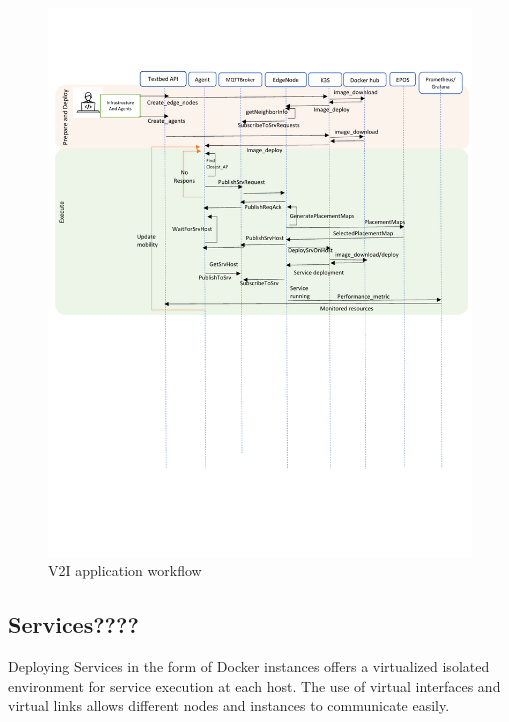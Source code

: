 \documentclass[conference]{IEEEtran}
\begin{document}
\begin{figure}
\includegraphics[clip, trim=0.2cm 12.3cm 0.3cm 3.2cm, width=\textwidth]{figures/workflow-4.pdf}
\caption{V2I application workflow}
\label{fig:workflow}
\end{figure}

\subsection{Services????}
\par Deploying Services in the form of Docker instances offers a virtualized isolated environment for service execution at each host. The use of virtual interfaces and virtual links allows different nodes and instances to communicate easily.
\end{document}
